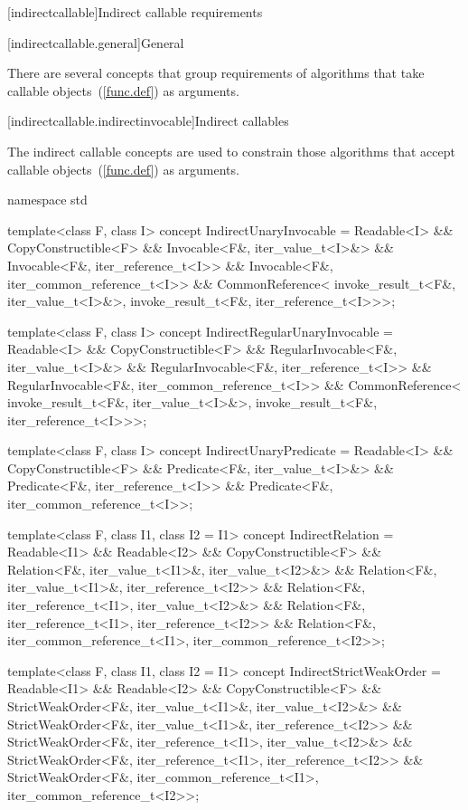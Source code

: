 [indirectcallable]{Indirect callable requirements}

[indirectcallable.general]{General}

\pnum
There are several concepts that group requirements of algorithms that
take callable objects~(\ref{func.def}) as arguments.

[indirectcallable.indirectinvocable]{Indirect callables}

\pnum
The indirect callable concepts are used to constrain those algorithms
that accept callable objects~(\ref{func.def}) as arguments.

%
%
%
%
%
\begin{codeblock}
namespace std {
  template<class F, class I>
    concept IndirectUnaryInvocable =
      Readable<I> &&
      CopyConstructible<F> &&
      Invocable<F&, iter_value_t<I>&> &&
      Invocable<F&, iter_reference_t<I>> &&
      Invocable<F&, iter_common_reference_t<I>> &&
      CommonReference<
        invoke_result_t<F&, iter_value_t<I>&>,
        invoke_result_t<F&, iter_reference_t<I>>>;

  template<class F, class I>
    concept IndirectRegularUnaryInvocable =
      Readable<I> &&
      CopyConstructible<F> &&
      RegularInvocable<F&, iter_value_t<I>&> &&
      RegularInvocable<F&, iter_reference_t<I>> &&
      RegularInvocable<F&, iter_common_reference_t<I>> &&
      CommonReference<
        invoke_result_t<F&, iter_value_t<I>&>,
        invoke_result_t<F&, iter_reference_t<I>>>;

  template<class F, class I>
    concept IndirectUnaryPredicate =
      Readable<I> &&
      CopyConstructible<F> &&
      Predicate<F&, iter_value_t<I>&> &&
      Predicate<F&, iter_reference_t<I>> &&
      Predicate<F&, iter_common_reference_t<I>>;

  template<class F, class I1, class I2 = I1>
    concept IndirectRelation =
      Readable<I1> && Readable<I2> &&
      CopyConstructible<F> &&
      Relation<F&, iter_value_t<I1>&, iter_value_t<I2>&> &&
      Relation<F&, iter_value_t<I1>&, iter_reference_t<I2>> &&
      Relation<F&, iter_reference_t<I1>, iter_value_t<I2>&> &&
      Relation<F&, iter_reference_t<I1>, iter_reference_t<I2>> &&
      Relation<F&, iter_common_reference_t<I1>, iter_common_reference_t<I2>>;

  template<class F, class I1, class I2 = I1>
    concept IndirectStrictWeakOrder =
      Readable<I1> && Readable<I2> &&
      CopyConstructible<F> &&
      StrictWeakOrder<F&, iter_value_t<I1>&, iter_value_t<I2>&> &&
      StrictWeakOrder<F&, iter_value_t<I1>&, iter_reference_t<I2>> &&
      StrictWeakOrder<F&, iter_reference_t<I1>, iter_value_t<I2>&> &&
      StrictWeakOrder<F&, iter_reference_t<I1>, iter_reference_t<I2>> &&
      StrictWeakOrder<F&, iter_common_reference_t<I1>, iter_common_reference_t<I2>>;
}
\end{codeblock}

